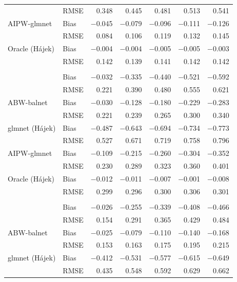 \documentclass[
  12pt,
  a4paper,
]{article}
\makeatletter
\renewenvironment{atbl}{\par\if@nobreak\else\Needspace*{6\baselineskip}\fi\def\@captype{atbl}\def\fps@table{H}}{\par}%
\makeatother
\begin{document}
\begin{atbl}
{\begin{longtable*}{llrrrrr}
{} & {RMSE} & {0.348} & {0.445} & {0.481} & {0.513} & {0.541} \\ 
{AIPW-glmnet} & {Bias} & {−0.045} & {−0.079} & {−0.096} & {−0.111} & {−0.126} \\ 
{} & {RMSE} & {0.084} & {0.106} & {0.119} & {0.132} & {0.145} \\ 
{Oracle (Hájek)} & {Bias} & {−0.004} & {−0.004} & {−0.005} & {−0.005} & {−0.003} \\ 
{} & {RMSE} & {0.142} & {0.139} & {0.141} & {0.142} & {0.142} \\ 
\midrule\addlinespace[2.5pt]
 \\[2.5pt] 
\midrule{} & {Bias} & {−0.032} & {−0.335} & {−0.440} & {−0.521} & {−0.592} \\ 
{} & {RMSE} & {0.221} & {0.390} & {0.480} & {0.555} & {0.621} \\ 
{ABW-balnet} & {Bias} & {−0.030} & {−0.128} & {−0.180} & {−0.229} & {−0.283} \\ 
{} & {RMSE} & {0.221} & {0.239} & {0.265} & {0.300} & {0.340} \\ 
{glmnet (Hájek)} & {Bias} & {−0.487} & {−0.643} & {−0.694} & {−0.734} & {−0.773} \\ 
{} & {RMSE} & {0.527} & {0.671} & {0.719} & {0.758} & {0.796} \\ 
{AIPW-glmnet} & {Bias} & {−0.109} & {−0.215} & {−0.260} & {−0.304} & {−0.352} \\ 
{} & {RMSE} & {0.230} & {0.289} & {0.323} & {0.360} & {0.401} \\ 
{Oracle (Hájek)} & {Bias} & {−0.012} & {−0.011} & {−0.007} & {−0.001} & {−0.008} \\ 
{} & {RMSE} & {0.299} & {0.296} & {0.300} & {0.306} & {0.301} \\ 
\midrule\addlinespace[2.5pt]
 \\[2.5pt] 
\midrule{} & {Bias} & {−0.026} & {−0.255} & {−0.339} & {−0.408} & {−0.466} \\ 
{} & {RMSE} & {0.154} & {0.291} & {0.365} & {0.429} & {0.484} \\ 
{ABW-balnet} & {Bias} & {−0.025} & {−0.079} & {−0.110} & {−0.140} & {−0.168} \\ 
{} & {RMSE} & {0.153} & {0.163} & {0.175} & {0.195} & {0.215} \\ 
{glmnet (Hájek)} & {Bias} & {−0.412} & {−0.531} & {−0.577} & {−0.615} & {−0.649} \\ 
{} & {RMSE} & {0.435} & {0.548} & {0.592} & {0.629} & {0.662} \\ 

\end{longtable*}}
\end{atbl}
\end{document}
